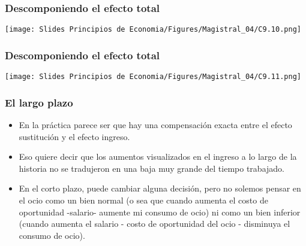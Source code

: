 \documentclass{beamer}
\begin{document}
\begin{frame}
  \frametitle{Descomponiendo el efecto total}
  \begin{center}
    \texttt{[image: Slides Principios de Economia/Figures/Magistral\_04/C9.10.png]}
  \end{center}
\end{frame}

\begin{frame}
  \frametitle{Descomponiendo el efecto total}
  \begin{center}
    \texttt{[image: Slides Principios de Economia/Figures/Magistral\_04/C9.11.png]}
  \end{center}
\end{frame}

\begin{frame}
  \frametitle{El largo plazo}
  \begin{itemize}
    \item En la práctica parece ser que hay una compensación exacta entre el efecto sustitución y el efecto ingreso.
    \item Eso quiere decir que los aumentos visualizados en el ingreso a lo largo de la historia no se tradujeron en una baja muy grande del tiempo trabajado.
    \item En el corto plazo, puede cambiar alguna decisión, pero no solemos pensar en el ocio como un bien normal (o sea que cuando aumenta el costo de oportunidad -salario- aumente mi consumo de ocio) ni como un bien inferior (cuando aumenta el salario - costo de oportunidad del ocio - disminuya el consumo de ocio).
  \end{itemize}
\end{frame}
\end{document}
